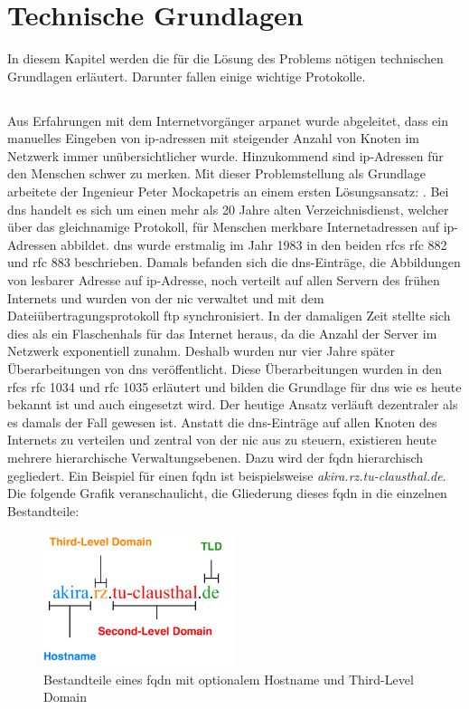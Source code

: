 \documentclass[titlepage]{report}
\begin{document}
\chapter*{Technische Grundlagen}
In diesem Kapitel werden die für die Lösung des Problems nötigen
technischen Grundlagen erläutert. Darunter fallen einige wichtige
Protokolle.
\section*{}
Aus Erfahrungen mit dem Internetvorgänger \gls{arpanet} wurde
abgeleitet, dass ein manuelles Eingeben von \gls{ip}\hyp{}adressen mit
steigender Anzahl von Knoten im Netzwerk immer unübersichtlicher wurde.
Hinzukommend sind \gls{ip}\hyp{}Adressen für den Menschen schwer zu
merken. Mit dieser Problemstellung als Grundlage arbeitete der Ingenieur
Peter Mockapetris an einem ersten Lösungsansatz: .
Bei \gls{dns} handelt es sich um einen mehr als 20 Jahre alten
Verzeichnisdienst, welcher über das gleichnamige Protokoll, für Menschen
merkbare Internetadressen auf \gls{ip}\hyp{}Adressen abbildet.
\gls{dns} wurde erstmalig im Jahr 1983 in den beiden \glspl{rfc}
\gls{rfc} 882\cite{RFC0882} und \gls{rfc} 883\cite{RFC0883} beschrieben.
Damals befanden sich die \gls{dns}\hyp{}Einträge, die Abbildungen von
lesbarer Adresse auf \gls{ip}\hyp{}Adresse, noch verteilt auf
allen Servern des frühen Internets und wurden von der \gls{nic} verwaltet
und mit dem Dateiübertragungsprotokoll \gls{ftp}
synchronisiert\cite{RFC1034}. In der damaligen Zeit stellte sich dies
als ein Flaschenhals für das Internet heraus, da die Anzahl der Server
im Netzwerk exponentiell zunahm. Deshalb wurden nur vier Jahre später
Überarbeitungen von \gls{dns} veröffentlicht. Diese Überarbeitungen
wurden in den \glspl{rfc} \gls{rfc} 1034 und \gls{rfc} 1035 erläutert
und bilden die Grundlage für \gls{dns} wie es heute bekannt ist und auch
eingesetzt wird. Der heutige Ansatz verläuft dezentraler als es damals
der Fall gewesen ist. Anstatt die \gls{dns}\hyp{}Einträge auf allen
Knoten des Internets zu verteilen und zentral von der \gls{nic} aus zu
steuern, existieren heute mehrere hierarchische Verwaltungsebenen. Dazu
wird der \gls{fqdn} hierarchisch gegliedert. Ein Beispiel für einen
\gls{fqdn} ist beispielsweise \emph{akira.rz.tu-clausthal.de}. Die
folgende Grafik veranschaulicht, die Gliederung dieses \gls{fqdn} in die
einzelnen Bestandteile:
\begin{figure}[h]
    \centering
    \includegraphics[width=0.5\textwidth]{figures/dnsname.pdf}
    \caption{Bestandteile eines \gls{fqdn} mit optionalem Hostname und Third-Level
    Domain}\label{fig:1}
\end{figure}
\end{document}
